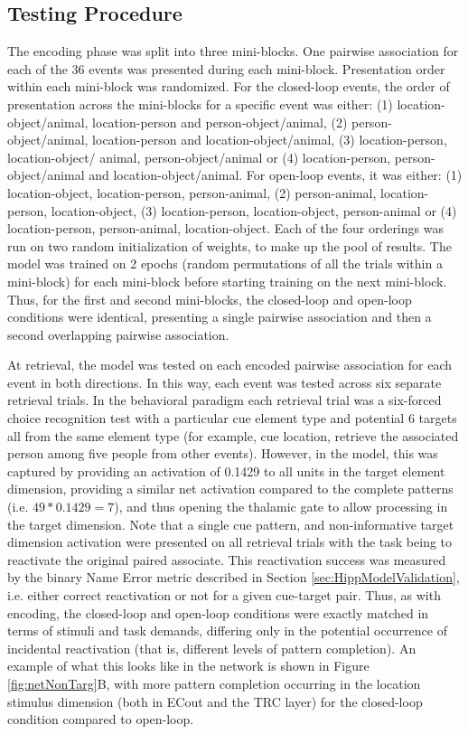 \documentclass[11pt, titlepage, twoside]{article}
\begin{document}
\subsection{Testing Procedure}
\label{sec:TestProc}
The encoding phase was split into three mini-blocks. One pairwise association for each of the 36 events was presented during each mini-block. Presentation order within each mini-block was randomized. For the closed-loop events, the order of presentation across the mini-blocks for a specific event was either: (1) location-object/animal, location-person and person-object/animal, (2) person-object/animal, location-person and location-object/animal, (3) location-person, location-object/ animal, person-object/animal or (4) location-person, person-object/animal and location-object/animal. For open-loop events, it was either: (1) location-object, location-person, person-animal, (2) person-animal, location-person, location-object, (3) location-person, location-object, person-animal or (4) location-person, person-animal, location-object. Each of the four orderings was run on two random initialization of weights, to make up the pool of results. The model was trained on 2 epochs (random permutations of all the trials within a mini-block) for each mini-block before starting training on the next mini-block.  Thus, for the first and second mini-blocks, the closed-loop and open-loop conditions were identical, presenting a single pairwise association and then a second overlapping pairwise association. %

At retrieval, the model was tested on each encoded pairwise association for each event in both directions.  In this way, each event was tested across six separate retrieval trials.  In the behavioral paradigm each retrieval trial was a six-forced choice recognition test with a particular cue element type and potential 6 targets all from the same element type (for example, cue location, retrieve the associated person among five people from other events).  However, in the model, this was captured by providing an activation of 0.1429 to all units in the target element dimension, providing a similar net activation compared to the complete patterns (i.e. $49 * 0.1429=7$), and thus opening the thalamic gate to allow processing in the target dimension. Note that a single cue pattern, and non-informative target dimension activation were presented on all retrieval trials with the task being to reactivate the original paired associate.  This reactivation success was measured by the binary Name Error metric described in Section \ref{sec:HippModelValidation}, i.e. either correct reactivation or not for a given cue-target pair. Thus, as with encoding, the closed-loop and open-loop conditions were exactly matched in terms of stimuli and task demands, differing only in the potential occurrence of incidental reactivation (that is, different levels of pattern completion).  An example of what this looks like in the network is shown in Figure \ref{fig:netNonTarg}B, with more pattern completion occurring in the location stimulus dimension (both in ECout and the TRC layer) for the closed-loop condition compared to open-loop.
\end{document}
